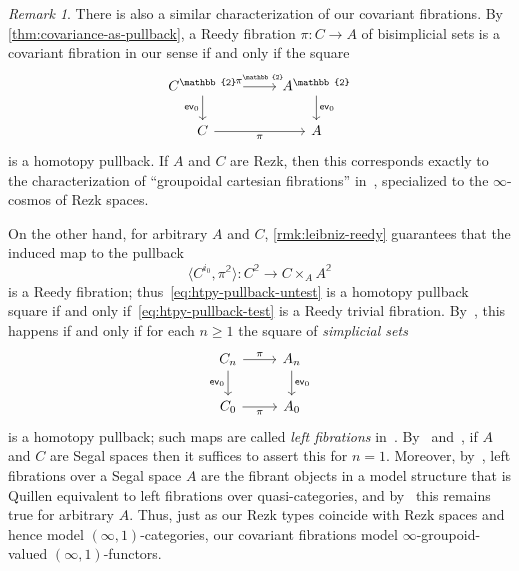 \documentclass[12pt]{amsart}
\theoremstyle{plain}
\theoremstyle{definition}
\theoremstyle{remark}
\newtheorem{rmk}[thm]{Remark}
\numberwithin{equation}{section}
\newcommand{\pair}[1]{\langle #1\rangle}
\newcommand{\two}{\mathbb{2}}
\begin{document}
\begin{rmk}\label{rmk:boavida}
  There is also a similar characterization of our covariant fibrations.
 By \cref{thm:covariance-as-pullback}, a Reedy fibration $\pi \colon C \to A$ of bisimplicial sets is a covariant fibration in our sense if and only if the square
  \begin{equation}
  \begin{tikzcd}
    C^\two \arrow[r, "{\pi^\two}"] \arrow[d, "{\mathsf{ev}_0}"'] &
    A^\two \arrow[d, "{\mathsf{ev}_0}"] \\
    C \arrow[r, "\pi"'] &
    A 
  \end{tikzcd}\label{eq:htpy-pullback-untest}
  \end{equation}
  is a homotopy pullback.
  If $A$ and $C$ are Rezk, then this corresponds exactly to the characterization of ``groupoidal cartesian fibrations'' in~\cite[Proposition 4.2.7]{RV4}, specialized to the $\infty$-cosmos of Rezk spaces.

  On the other hand, for arbitrary $A$ and $C$, \cref{rmk:leibniz-reedy} guarantees that the induced map to the pullback
  \begin{equation}\label{eq:htpy-pullback-test} \pair{ C^{i_0}, \pi^\two}  \colon C^\two \to C \times_A A^\two\end{equation}
  is a Reedy fibration; thus~\eqref{eq:htpy-pullback-untest} is a homotopy pullback square if and only if~\eqref{eq:htpy-pullback-test} is a Reedy trivial fibration.
  By~\cite[Lemma 2.1.3]{kv:yoneda-css}, this happens if and only if for each $n\ge 1$ the square of \emph{simplicial sets}
  \[ \begin{tikzcd} C_n \arrow[r, "\pi"] \arrow[d, "{\mathsf{ev}_0}"'] &
    A_n \arrow[d, "{\mathsf{ev}_0}"] \\
    C_0 \arrow[r, "\pi"'] &
    A_0
    \end{tikzcd}\]
  is a homotopy pullback; such maps are called \emph{left fibrations} in~\cite{kv:yoneda-css}.
  By~\cite[Proposition 1.7]{boavida:segr} and~\cite[Lemma 3.9]{rasekh:yoneda-ss}, if $A$ and $C$ are Segal spaces then it suffices to assert this for $n=1$.
  Moreover, by~\cite[Proposition 1.10]{boavida:segr}, left fibrations over a Segal space $A$ are the fibrant objects in a model structure that is Quillen equivalent to left fibrations over quasi-categories, and by~\cite[Theorem 4.8]{rasekh:yoneda-ss} this remains true for arbitrary $A$.
  Thus, just as our Rezk types coincide with Rezk spaces and hence model $(\infty,1)$-categories, our covariant fibrations model $\infty$-groupoid-valued $(\infty,1)$-functors.
\end{rmk}




%

\end{document}
